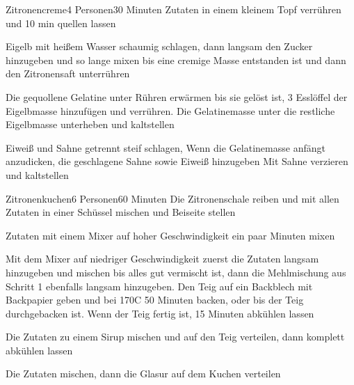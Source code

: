 \begin{recipe}{Zitronencreme}{4 Personen}{30 Minuten}
Zutaten in einem kleinem Topf verrühren und 10 min quellen lassen

Eigelb mit heißem Wasser schaumig schlagen, dann langsam den Zucker hinzugeben und so lange mixen bis eine cremige Masse entstanden ist und dann den Zitronensaft unterrühren

\ing[]{}{}
Die gequollene Gelatine unter Rühren erwärmen bis sie gelöst ist, 3 Esslöffel der Eigelbmasse hinzufügen und verrühren. Die Gelatinemasse unter die restliche Eigelbmasse unterheben und kaltstellen

Eiweiß und Sahne getrennt steif schlagen,
Wenn die Gelatinemasse anfängt anzudicken, die geschlagene Sahne sowie Eiweiß hinzugeben
Mit Sahne verzieren und kaltstellen
\end{recipe}


\begin{recipe}{Zitronenkuchen}{6 Personen}{60 Minuten}
Die Zitronenschale reiben und mit allen Zutaten in einer Schüssel mischen und Beiseite stellen

Zutaten mit einem Mixer auf hoher Geschwindigkeit ein paar Minuten mixen

Mit dem Mixer auf niedriger Geschwindigkeit zuerst die Zutaten langsam hinzugeben und mischen bis alles gut vermischt ist, dann die Mehlmischung aus Schritt 1 ebenfalls langsam hinzugeben. Den Teig auf ein Backblech mit Backpapier geben und bei 170\0C 50 Minuten backen, oder bis der Teig durchgebacken ist. Wenn der Teig fertig ist, 15 Minuten abkühlen lassen

Die Zutaten zu einem Sirup mischen und auf den Teig verteilen, dann komplett abkühlen lassen

Die Zutaten mischen, dann die Glasur auf dem Kuchen verteilen
\end{recipe}


